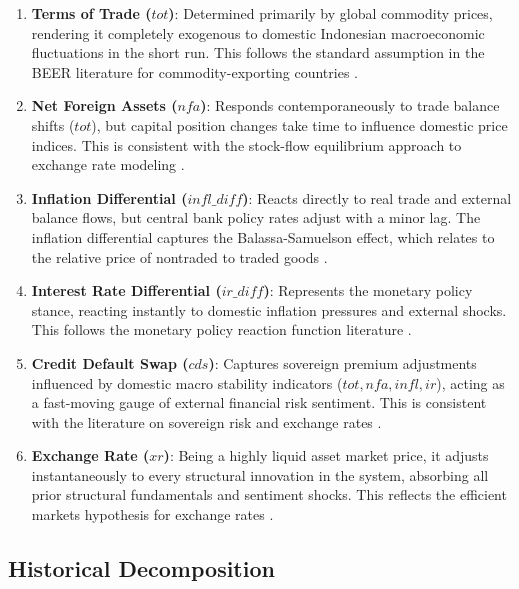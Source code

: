 \documentclass[11pt,a4paper]{article}
\begin{document}
\begin{enumerate}[label=\textbf{\arabic*.}]
    \item \textbf{Terms of Trade ($tot$)}: Determined primarily by global commodity prices, rendering it completely exogenous to domestic Indonesian macroeconomic fluctuations in the short run. This follows the standard assumption in the BEER literature for commodity-exporting countries \citep{Edwards1989, Elbadawi1994}.
    
    \item \textbf{Net Foreign Assets ($nfa$)}: Responds contemporaneously to trade balance shifts ($tot$), but capital position changes take time to influence domestic price indices. This is consistent with the stock-flow equilibrium approach to exchange rate modeling \citep{Faruque1995, ClarkMacDonald1998}.
    
    \item \textbf{Inflation Differential ($infl\_diff$)}: Reacts directly to real trade and external balance flows, but central bank policy rates adjust with a minor lag. The inflation differential captures the Balassa-Samuelson effect, which relates to the relative price of nontraded to traded goods \citep{ClarkMacDonald1998}.
    
    \item \textbf{Interest Rate Differential ($ir\_diff$)}: Represents the monetary policy stance, reacting instantly to domestic inflation pressures and external shocks. This follows the monetary policy reaction function literature \citep{Taylor1993}.
    
    \item \textbf{Credit Default Swap ($cds$)}: Captures sovereign premium adjustments influenced by domestic macro stability indicators ($tot, nfa, infl, ir$), acting as a fast-moving gauge of external financial risk sentiment. This is consistent with the literature on sovereign risk and exchange rates \citep{Edwards1989}.
    
    \item \textbf{Exchange Rate ($xr$)}: Being a highly liquid asset market price, it adjusts instantaneously to every structural innovation in the system, absorbing all prior structural fundamentals and sentiment shocks. This reflects the efficient markets hypothesis for exchange rates \citep{ClarkMacDonald1998}.
\end{enumerate}

\subsection{Historical Decomposition}
\end{document}
